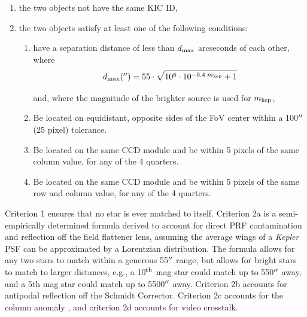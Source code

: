 \begin{enumerate}

\item the two objects not have the same KIC ID,

\item the two objects satisfy at least one of the following conditions: 

    \begin{enumerate}
    
    \item have a separation distance of less than $d_{\rm max}$ arcseconds of each other, where
    \begin{equation}
    \label{disteq}
    d_{\rm max}(\arcsec) = 55\cdot\sqrt{10^{6}\cdot 10^{-0.4 \cdot m_{\rm kep}}+1}
    \end{equation}

\noindent and, where the magnitude of the brighter source is used for $m_{\rm kep}$,  

    \item Be located on equidistant, opposite sides of the FoV center within a 100$\mbox{$^{\prime\prime}$}$ (25 pixel) tolerance.
    
    \item Be located on the same CCD module and be within 5 pixels of the same column value, for any of the 4 quarters.
    
    \item Be located on the same CCD module and be within 5 pixels of the same row and column value, for any of the 4 quarters.

   \end{enumerate}

\end{enumerate}


\noindent Criterion 1 ensures that no star is ever matched to itself. Criterion 2a is a semi-empirically determined formula derived to account for direct PRF contamination and reflection off the field flattener lens, assuming the average wings of a \emph{Kepler} PSF can be approximated by a Lorentzian distribution. The formula allows for any two stars to match within a generous 55$\mbox{$^{\prime\prime}$}$ range, but allows for bright stars to match to larger distances, e.g., a 10$^{\rm th}$ mag star could match up to 550$\mbox{$^{\prime\prime}$}$ away, and a 5th mag star could match up to 5500$\mbox{$^{\prime\prime}$}$ away. Criterion 2b accounts for antipodal reflection off the Schmidt Corrector. Criterion 2c accounts for the column anomaly \citep[see \S3.5 of][]{Coughlin2016}, and criterion 2d accounts for video crosstalk.


